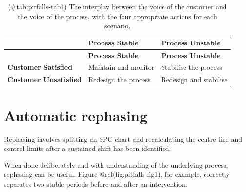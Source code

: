 \documentclass[
]{book}
\begin{document}
\begin{longtable}[]{@{}
  >{\raggedright\arraybackslash}p{}
  >{\raggedright\arraybackslash}p{}
  >{\raggedright\arraybackslash}p{}@{}}
\caption{(\#tab:pitfalls-tab1) The interplay between the voice of the
customer and the voice of the process, with the four appropriate actions
for each scenario.}\tabularnewline
\toprule\noalign{}
\begin{minipage}[b]{\linewidth}\raggedright
\end{minipage} & \begin{minipage}[b]{\linewidth}\raggedright
\textbf{Process Stable}
\end{minipage} & \begin{minipage}[b]{\linewidth}\raggedright
\textbf{Process Unstable}
\end{minipage} \\
\midrule\noalign{}
\endfirsthead
\toprule\noalign{}
\begin{minipage}[b]{\linewidth}\raggedright
\end{minipage} & \begin{minipage}[b]{\linewidth}\raggedright
\textbf{Process Stable}
\end{minipage} & \begin{minipage}[b]{\linewidth}\raggedright
\textbf{Process Unstable}
\end{minipage} \\
\midrule\noalign{}
\endhead
\bottomrule\noalign{}
\endlastfoot
\textbf{Customer Satisfied} & Maintain and monitor & Stabilise the
process \\
\textbf{Customer Unsatisfied} & Redesign the process & Redesign and
stabilise \\
\end{longtable}

\section{Automatic rephasing}\label{automatic-rephasing}

Rephasing involves splitting an SPC chart and recalculating the centre
line and control limits after a sustained shift has been identified.

When done deliberately and with understanding of the underlying process,
rephasing can be useful. Figure @ref(fig:pitfalls-fig1), for example,
correctly separates two stable periods before and after an intervention.
\end{document}
